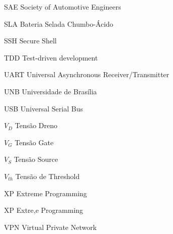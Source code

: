 \begin{siglas}
    \item [SAE]	 Society of Automotive Engineers
    \item [SLA]	 Bateria Selada Chumbo-Ácido
    \item [SSH]	 Secure Shell
    \item [TDD]	 Test-driven development
    \item [UART]	 Universal Asynchronous Receiver/Transmitter
    \item [UNB]	 Universidade de Brasília
    \item [USB]	 Universal Serial Bus
	\item [$V_{D}$]	 Tensão Dreno
    \item [$V_{G}$]	 Tensão Gate
    \item [$V_{S}$]	 Tensão Source
    \item [$V_{th}$]	 Tensão de Threshold
    \item [XP]	 Extreme Programming
    \item [XP]	 Extre,e Programming
    \item[VPN]	 Virtual Private Network
\end{siglas}
